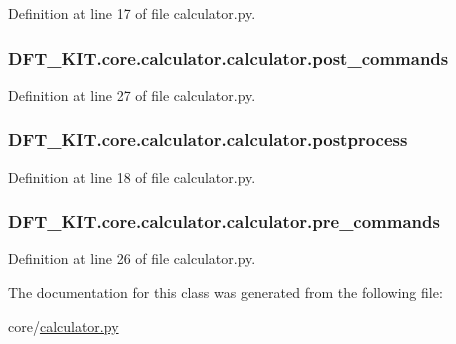 Definition at line 17 of file calculator.\+py.

\hypertarget{class_d_f_t___k_i_t_1_1core_1_1calculator_1_1calculator_a0b83a4e589b749c56e54c5d42e0049d5}{
\subsubsection[{post\+\_\+commands}]{\setlength{\rightskip}{0pt plus 5cm}D\+F\+T\+\_\+\+K\+I\+T.\+core.\+calculator.\+calculator.\+post\+\_\+commands}}\label{class_d_f_t___k_i_t_1_1core_1_1calculator_1_1calculator_a0b83a4e589b749c56e54c5d42e0049d5}


Definition at line 27 of file calculator.\+py.

\hypertarget{class_d_f_t___k_i_t_1_1core_1_1calculator_1_1calculator_a8ae7016b72ab4e047242b2aeb3e5ce68}{
\subsubsection[{postprocess}]{\setlength{\rightskip}{0pt plus 5cm}D\+F\+T\+\_\+\+K\+I\+T.\+core.\+calculator.\+calculator.\+postprocess}}\label{class_d_f_t___k_i_t_1_1core_1_1calculator_1_1calculator_a8ae7016b72ab4e047242b2aeb3e5ce68}


Definition at line 18 of file calculator.\+py.

\hypertarget{class_d_f_t___k_i_t_1_1core_1_1calculator_1_1calculator_aa16b2c67c6adf6c612f76b485292d8a8}{
\subsubsection[{pre\+\_\+commands}]{\setlength{\rightskip}{0pt plus 5cm}D\+F\+T\+\_\+\+K\+I\+T.\+core.\+calculator.\+calculator.\+pre\+\_\+commands}}\label{class_d_f_t___k_i_t_1_1core_1_1calculator_1_1calculator_aa16b2c67c6adf6c612f76b485292d8a8}


Definition at line 26 of file calculator.\+py.



The documentation for this class was generated from the following file\+:\begin{DoxyCompactItemize}
\item 
core/\hyperlink{calculator_8py}{calculator.\+py}\end{DoxyCompactItemize}
